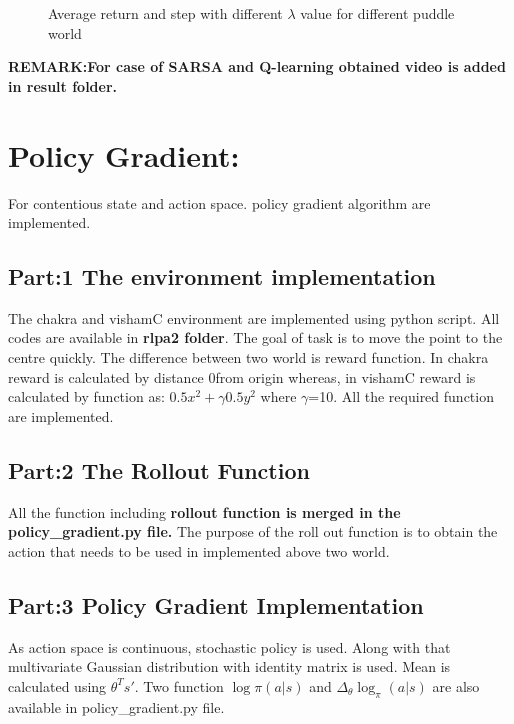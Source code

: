 \documentclass[preprint,12pt]{elsarticle}
\begin{document}
\begin{figure}[H]
	\centering  
	\caption{Average return and step with different $\lambda$ value for different puddle world }
	\label{fig:SLBC}
\end{figure}

\textbf{REMARK:For case of SARSA and Q-learning obtained video is added in result folder.}


\section{Policy Gradient:}
 For contentious state and action space. policy gradient algorithm are implemented. \cite{david}
 \subsection{Part:1 The environment implementation}
 The  chakra and vishamC environment are implemented using python script. All codes are available in \textbf{rlpa2 folder}.
 The goal of task is to move the point to the centre quickly. The difference between two world is reward function. In chakra reward is calculated by distance 0from origin whereas, in vishamC reward is calculated by function as: $0.5x^2 + \gamma 0.5 y^2$ where $\gamma$=10.
 All the required function are implemented.
 
 \vspace{2mm}
 \subsection{Part:2 The Rollout Function}
  All the function including \textbf{rollout function is merged in the policy\_gradient.py file.} The purpose of the roll out function is to obtain the action that needs to be used in implemented above two world.
  
   \vspace{2mm}
 \subsection{Part:3 Policy Gradient Implementation}
	As action space is continuous, stochastic  policy is used. Along with that multivariate Gaussian distribution with identity matrix is used. Mean is calculated using $\theta^T s'$. Two function $ \log \pi (a|s)$ and $\Delta_\theta \log_\pi (a|s)$ are also available in policy\_gradient.py file.
	
\end{document}
